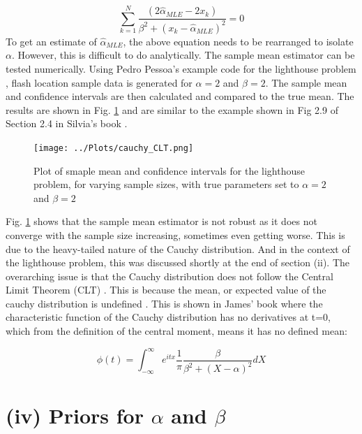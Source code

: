\documentclass[12pt]{report} %
\begin{document}
\begin{equation}
    \sum_{k=1}^{N} \frac{(2\hat{\alpha}_{MLE} - 2x_{k})}{\beta^{2} + (x_{k} - \hat{\alpha}_{MLE})^{2}} = 0
\end{equation}
\newline
To get an estimate of $\hat{\alpha}_{MLE}$, the above equation needs to be rearranged to isolate $\alpha$. However, this is difficult to do analytically. The sample mean estimator can be tested numerically. Using Pedro Pessoa's example code for the lighthouse problem \cite{pessoa_lighthouse}, flash location sample data is generated for $\alpha = 2$ and $\beta = 2$. The sample mean and confidence intervals are then calculated and compared to the true mean. The results are shown in Fig. \ref{fig:sample_mean} and are similar to the example shown in Fig 2.9 of Section 2.4 in Silvia's book \cite{sivia_data_analysis}.

\begin{figure}[h]
\centering
\texttt{[image: ../Plots/cauchy\_CLT.png]}
\caption{Plot of smaple mean and confidence intervals for the lighthouse problem, for varying sample sizes, with true parameters set to $\alpha = 2$ and $\beta = 2$}
\label{fig:sample_mean}
\end{figure}

Fig. \ref{fig:sample_mean} shows that the sample mean estimator is not robust as it does not converge with the sample size increasing, sometimes even getting worse. This is due to the heavy-tailed nature of the Cauchy distribution. And in the context of the lighthouse problem, this was discussed shortly at the end of section (ii). The overarching issue is that the Cauchy distribution does not follow the Central Limit Theorem (CLT) \cite[p34]{sivia_data_analysis}. This is because the mean, or expected value of the cauchy distribution is undefined \cite[p84]{FJames2006}. This is shown in James' book \cite[p34]{FJames2006} where the characteristic function of the Cauchy distribution has no derivatives at t=0, which from the definition of the central moment, means it has no defined mean:

\begin{equation}
    \phi(t) = \int_{-\infty}^{\infty} e^{itx} \frac{1}{\pi} \frac{\beta}{\beta^{2} + (X - \alpha)^{2}} dX
\end{equation}


\section*{(iv) Priors for $\alpha$ and $\beta$}
\end{document}

